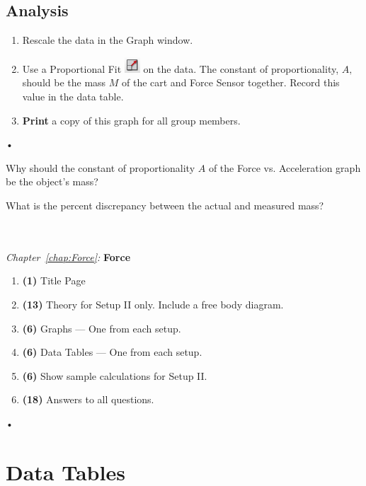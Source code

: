 \documentclass[main.tex]{subfiles}
\begin{document}
\subsection*{Analysis}
\begin{enumerate}
\item
Rescale the data in the Graph window.
\item
Use a Proportional Fit \includegraphics{Rescale} on the data. The constant of proportionality, $A,$ should be the mass $M$ of the cart and Force Sensor together. Record this value in the data table.
\item
\textbf{Print} a copy of this graph for all group members.
\end{enumerate}•

\begin{question}
Why should the constant of proportionality $A$ of the Force vs. Acceleration graph be the object's mass?
\end{question}
\begin{question}
What is the percent discrepancy between the actual and measured mass?
\end{question}

\begin{samepage}
\hrulefill\\ \\
\emph{Chapter~\ref{chap:Force}:} \textbf{Force}
\begin{enumerate}
\item
\textbf{(1)} Title Page
\item
\textbf{(13)} Theory for Setup II only. Include a free body diagram.
\item
\textbf{(6)} Graphs --- One from each setup.
\item
\textbf{(6)} Data Tables --- One from each setup.
\item
\textbf{(6)} Show sample calculations for Setup II.
\item
\textbf{(18)} Answers to all questions.
\end{enumerate}•
\end{samepage}

\newpage
\section{Data Tables}
\end{document}

